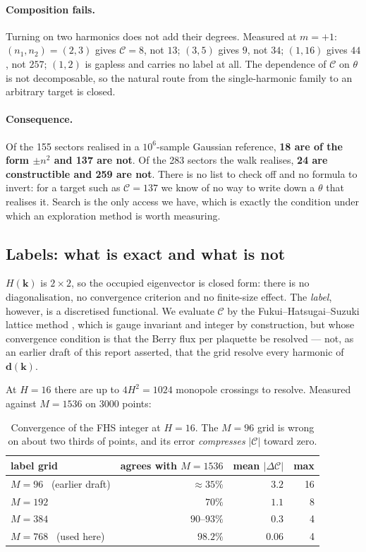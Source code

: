 \documentclass[11pt]{article}
\newcommand{\good}[1]{\textcolor{blue!70!black}{\textbf{#1}}}
\newcommand{\bad}[1]{\textcolor{red!65!black}{#1}}
\newcommand{\kk}{\mathbf{k}}
\newcommand{\dd}{\mathbf{d}}
\begin{document}
\paragraph{Composition fails.} Turning on two harmonics does not add their
degrees. Measured at $m=+1$: $(n_1,n_2)=(2,3)$ gives $\mathcal{C}=8$, not
$13$; $(3,5)$ gives $9$, not $34$; $(1,16)$ gives $44$, not $257$; $(1,2)$ is
gapless and carries no label at all. The dependence of $\mathcal{C}$ on
$\theta$ is not decomposable, so the natural route from the single-harmonic
family to an arbitrary target is closed.

\paragraph{Consequence.} Of the 155 sectors realised in a $10^6$-sample
Gaussian reference, \good{18 are of the form $\pm n^2$ and 137 are not}. Of the
283 sectors the walk realises, \good{24 are constructible and 259 are not}.
There is no list to check off and no formula to invert: for a target such as
$\mathcal{C}=137$ we know of no way to write down a $\theta$ that realises it.
Search is the only access we have, which is exactly the condition under which
an exploration method is worth measuring.

\subsection{Labels: what is exact and what is not}
\label{sec:labels}

$H(\kk)$ is $2\times2$, so the occupied eigenvector is closed form: there is no
diagonalisation, no convergence criterion and no finite-size effect. The
\emph{label}, however, is a discretised functional. We evaluate $\mathcal{C}$
by the Fukui--Hatsugai--Suzuki lattice method \cite{fhs2005}, which is gauge
invariant and integer by construction, but whose convergence condition is that
the Berry flux per plaquette be resolved --- not, as an earlier draft of this
report asserted, that the grid resolve every harmonic of $\dd(\kk)$.

At $H=16$ there are up to $4H^2=1024$ monopole crossings to resolve. Measured
against $M=1536$ on $3000$ points:

\begin{table}[h]\centering\small
\begin{tabular}{lrrr}
\toprule
label grid & agrees with $M{=}1536$ & mean $|\Delta\mathcal{C}|$ & max \\
\midrule
$M=96$ \ (earlier draft) & \bad{$\approx35\%$} & $3.2$ & 16 \\
$M=192$ & $70\%$ & $1.1$ & 8 \\
$M=384$ & $90$--$93\%$ & $0.3$ & 4 \\
$M=768$ \ (used here) & \good{$98.2\%$} & $0.06$ & 4 \\
\bottomrule
\end{tabular}
\caption{Convergence of the FHS integer at $H=16$. The $M=96$ grid is wrong on
about two thirds of points, and its error \emph{compresses} $|\mathcal{C}|$
toward zero.}
\end{table}
\end{document}
